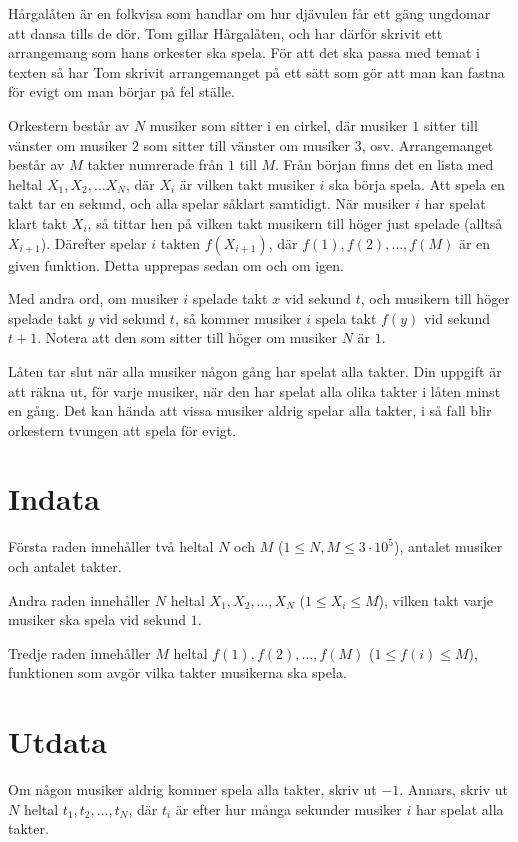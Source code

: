 \noindent

Hårgalåten är en folkvisa som handlar om hur djävulen får ett gäng ungdomar att dansa
tills de dör. Tom gillar Hårgalåten, och har därför skrivit ett arrangemang som hans
orkester ska spela. För att det ska passa med temat i texten så har Tom skrivit 
arrangemanget på ett sätt som gör att man kan fastna för evigt om man börjar på fel ställe.

Orkestern består av $N$ musiker som sitter i en cirkel, där musiker $1$ sitter till vänster om 
musiker $2$ som sitter till vänster om musiker $3$, osv. Arrangemanget består av $M$ 
takter numrerade från $1$ till $M$. Från början finns det en lista med heltal $X_1, X_2, \dots X_N$,
där $X_i$ är vilken takt musiker $i$ ska börja spela. Att spela en takt tar en sekund, och alla
spelar såklart samtidigt. När musiker $i$ har spelat klart takt $X_i$, så tittar hen på vilken 
takt musikern till höger just spelade (alltså $X_{i+1}$). Därefter spelar $i$ takten $f(X_{i+1})$,
där $f(1), f(2), \dots, f(M)$ är en given funktion. Detta upprepas sedan om och om igen.

Med andra ord, om musiker $i$ spelade takt $x$ vid sekund $t$, och musikern till höger spelade takt
$y$ vid sekund $t$, så kommer musiker $i$ spela takt $f(y)$ vid sekund $t+1$. Notera att den som sitter 
till höger om musiker $N$ är $1$.

Låten tar slut när alla musiker någon gång har spelat alla takter. Din uppgift är att räkna 
ut, för varje musiker, när den har spelat alla olika takter i låten minst en gång. Det kan hända 
att vissa musiker aldrig spelar alla takter, i så fall blir orkestern tvungen att spela för evigt.

\section*{Indata}
Första raden innehåller två heltal $N$ och $M$ ($1 \leq N,M \leq 3 \cdot 10^5$), antalet 
musiker och antalet takter.

Andra raden innehåller $N$ heltal $X_1, X_2, \dots, X_N$ ($1 \leq X_i \leq M$), vilken takt varje musiker ska 
spela vid sekund $1$.

Tredje raden innehåller $M$ heltal $f(1), f(2), \dots, f(M)$ ($1 \leq f(i) \leq M$), funktionen som 
avgör vilka takter musikerna ska spela.

\section*{Utdata}
Om någon musiker aldrig kommer spela alla takter, skriv ut $-1$.
Annars, skriv ut $N$ heltal $t_1, t_2, \dots, t_N$, där $t_i$ är efter hur många sekunder musiker 
$i$ har spelat alla takter.

